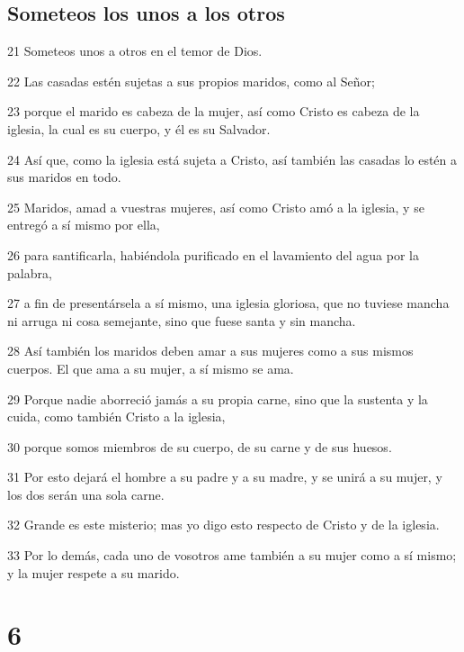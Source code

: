 \section*{Someteos los unos a los otros}

\par 21 Someteos unos a otros en el temor de Dios.
\par 22 Las casadas estén sujetas a sus propios maridos, como al Señor;
\par 23 porque el marido es cabeza de la mujer, así como Cristo es cabeza de la iglesia, la cual es su cuerpo, y él es su Salvador.
\par 24 Así que, como la iglesia está sujeta a Cristo, así también las casadas lo estén a sus maridos en todo.
\par 25 Maridos, amad a vuestras mujeres, así como Cristo amó a la iglesia, y se entregó a sí mismo por ella,
\par 26 para santificarla, habiéndola purificado en el lavamiento del agua por la palabra,
\par 27 a fin de presentársela a sí mismo, una iglesia gloriosa, que no tuviese mancha ni arruga ni cosa semejante, sino que fuese santa y sin mancha.
\par 28 Así también los maridos deben amar a sus mujeres como a sus mismos cuerpos. El que ama a su mujer, a sí mismo se ama.
\par 29 Porque nadie aborreció jamás a su propia carne, sino que la sustenta y la cuida, como también Cristo a la iglesia,
\par 30 porque somos miembros de su cuerpo, de su carne y de sus huesos.
\par 31 Por esto dejará el hombre a su padre y a su madre, y se unirá a su mujer, y los dos serán una sola carne.
\par 32 Grande es este misterio; mas yo digo esto respecto de Cristo y de la iglesia.
\par 33 Por lo demás, cada uno de vosotros ame también a su mujer como a sí mismo; y la mujer respete a su marido.

\chapter{6}

